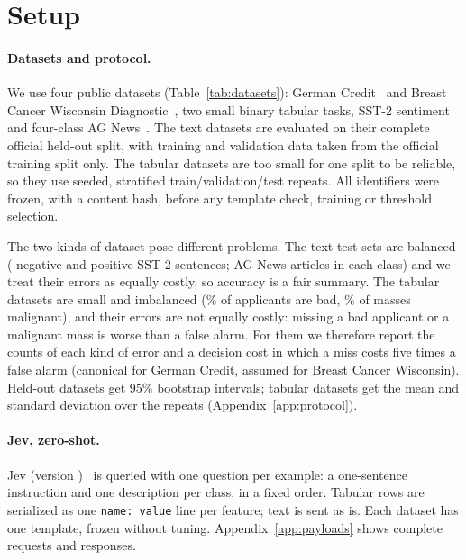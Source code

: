 \section{Setup}
\label{sec:setup}

\paragraph{Datasets and protocol.}
We use four public datasets (Table~\ref{tab:datasets}): German Credit~\citep{statlog_german} and
Breast Cancer Wisconsin Diagnostic~\citep{wolberg1995wdbc}, two small binary tabular tasks, SST-2
sentiment~\citep{socher2013sst,wang2019glue} and four-class AG News~\citep{zhang2015agnews}. The
text datasets are evaluated on their complete official held-out split, with training and
validation data taken from the official training split only. The tabular datasets are too small
for one split to be reliable, so they use \NRepeats{} seeded, stratified
\SplitFractions{} train/validation/test repeats. All identifiers were frozen, with a content
hash, before any template check, training or threshold selection.

The two kinds of dataset pose different problems. The text test sets are balanced
(\NTestNegativeSst{} negative and \NTestPositiveSst{} positive SST-2 sentences;
\NTestPerClassMinAgnews{} AG News articles in each class) and we treat their errors as equally
costly, so accuracy is a fair summary. The tabular datasets are small and imbalanced
(\PctTestPositiveGerman\% of applicants are bad, \PctTestPositiveWdbc\% of masses malignant),
and their errors are not equally costly: missing a bad applicant or a malignant mass is worse
than a false alarm. For them we therefore report the counts of each kind of error and a decision
cost in which a miss costs five times a false alarm (canonical for German Credit, assumed for
Breast Cancer Wisconsin). Held-out datasets get 95\%
bootstrap intervals; tabular datasets get the mean and standard deviation over the repeats
(Appendix~\ref{app:protocol}).

\begin{table}[t]
  \caption{Datasets. Evaluation examples are the official held-out split (text) or the test part
    of each of \NRepeats{} split repeats (tabular); training and validation sizes are per repeat.}
  \label{tab:datasets}
  \centering\small
  
\end{table}

\paragraph{Jev, zero-shot.}
Jev (version \texttt{\JevModel})~\citep{typesafe_sdk} is queried with one question per example: a
one-sentence instruction and one description per class, in a fixed order. Tabular rows are
serialized as one \texttt{name: value} line per feature; text is sent as is. Each dataset has one
template, frozen without tuning. Appendix~\ref{app:payloads} shows complete requests and
responses.

